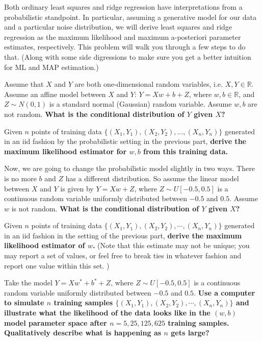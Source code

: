 Both ordinary least squares and ridge regression have interpretations
from a probabilistic standpoint. In particular, assuming a generative
model for our data and a particular noise distribution, we will derive
least squares and ridge regression as the maximum likelihood and
maximum a-posteriori parameter estimates, respectively. This problem
will walk you through a few steps to do that. (Along with some side
digressions to make sure you get a better intuition for ML and MAP
estimation.)  

\begin{Parts}
\Part Assume that $X$ and $Y$ are both one-dimensional random
variables, i.e. $X, Y \in \mathbb{R}$. Assume an affine model between
$X$ and $Y$: $Y=Xw+b+Z$, where $w, b \in \mathbb{R}$, and $Z \sim
N(0,1)$ is a standard normal (Gaussian) random variable. Assume $w, b$ are not random. {\bf What is the conditional distribution of $Y$ given $X$?}



\Part Given $n$ points of training data $\{(X_1,Y_1),(X_2,Y_2),\ldots, (X_n,Y_n)\}$ generated in
an iid fashion by the probabilistic setting in the previous part, {\bf
  derive the maximum likelihood estimator for $w,b$ from this training
  data.} 




\Part Now, we are going to change the probabilistic model slightly in
two ways. There is no more $b$ and $Z$ has a different
distribution. So assume the linear model between $X$ and $Y$ is given
by $Y=Xw+Z$, where $Z \sim U[-0.5,0.5]$ is a continuous random
variable uniformly distributed between $-0.5$ and $0.5$. Assume $w$ is
not random. {\bf What is the conditional distribution of $Y$ given
  $X$?} 



\Part Given $n$ points of training data $\{(X_1,Y_1),(X_2,Y_2),\cdots,
(X_n,Y_n)\}$ generated in an iid fashion in the setting of the
previous part, {\bf derive the maximum likelihood estimator of $w$.}
(Note that this estimate may not be unique; you may report a set of values, or feel free to break ties in whatever fashion and report one value within this set. )



\Part Take the model $Y=Xw^*+b^*+Z$, where $Z \sim U[-0.5,0.5]$ is a continuous random
variable uniformly distributed between $-0.5$ and $0.5$. {\bf Use a computer
  to simulate $n$ training samples $\{(X_1,Y_1),(X_2,Y_2),\cdots,
(X_n,Y_n)\}$ and illustrate what the likelihood of the data looks like
  in the $(w,b)$ model parameter space after $n=5, 25, 125, 625$
  training samples. Qualitatively describe what is happening as $n$
  gets large?}  


\end{Parts}
